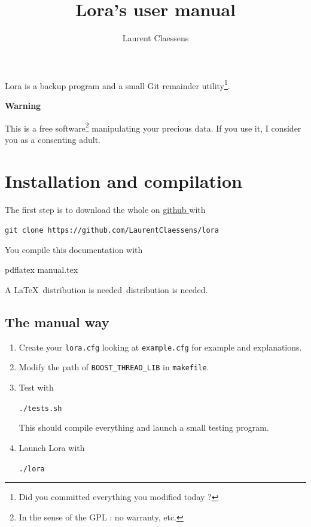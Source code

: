 \documentclass[a4paper,12pt]{article}
\newcommand{\info}[1]{\texttt{#1}}
\begin{document}
\title{Lora's user manual}
\author{Laurent Claessens}
\maketitle

Lora is a backup program and a small Git remainder utility\footnote{Did you committed everything you modified today ?}.

\begin{center}
    {\bf Warning}
\end{center}
This is a free software\footnote{In the sense of the GPL : no warranty, etc.} manipulating your precious data. If you use it, I consider you as a consenting adult.

\tableofcontents

\section{Installation and compilation}

The first step is to download the whole on \href{ https://github.com/LaurentClaessens/lora  }{ github } with
\begin{center}
    \info{git clone https://github.com/LaurentClaessens/lora}
\end{center}

You compile this documentation with
\begin{center}
    pdflatex manual.tex
\end{center}
A \LaTeX\ distribution is needed\ distribution is needed.

\subsection{The manual way}

\begin{enumerate}
    \item
        Create your \info{lora.cfg} looking at \info{example.cfg} for example and explanations.
    \item
        Modify the path of \info{BOOST\_THREAD\_LIB} in \info{makefile}.
    \item
        Test with
        \begin{center}
            \info{./tests.sh}
        \end{center}
        This should compile everything and launch a small testing program.
    \item
        Launch Lora with
        \begin{center}
            \info{./lora}
        \end{center}
\end{enumerate}
\end{document}
